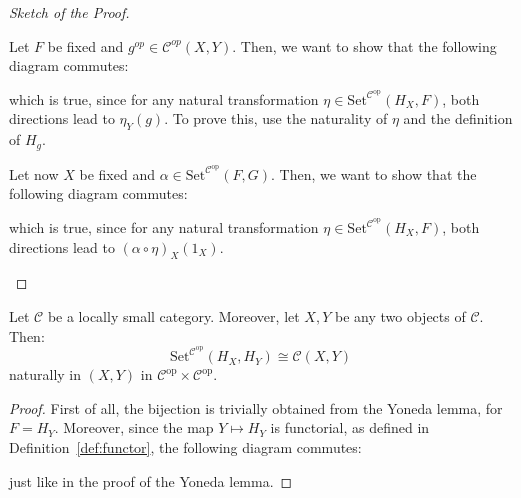 \begin{proof}[Sketch of the Proof]
\begin{itemize}
Let $F$ be fixed and $g^{op}\in\mathcal{C}^{op}(X,Y)$. Then, we want to show that the following diagram commutes:
\begin{center}
\end{center}
which is true, since for any natural transformation $\eta\in\mathrm{Set}^{\mathcal{C}^{\mathrm{op}}}(H_X,F)$, both directions lead to $\eta_Y(g)$. To prove this, use the naturality of $\eta$ and the definition of $H_g$.

Let now $X$ be fixed and $\alpha\in\mathrm{Set}^{\mathcal{C}^{\mathrm{op}}}(F,G)$. Then, we want to show that the following diagram commutes:
\begin{center}
\end{center}
which is true, since for any natural transformation $\eta\in\mathrm{Set}^{\mathcal{C}^{\mathrm{op}}}(H_X,F)$, both directions lead to $(\alpha\circ\eta)_X(1_X)$.\qedhere
\end{itemize}
\end{proof}
\begin{corollary} Let $\mathcal{C}$ be a locally small category. Moreover, let $X,Y$ be any two objects of $\mathcal{C}$. Then:
\[\mathrm{Set}^{\mathcal{C}^{\mathrm{op}}}(H_X,H_Y)\cong\mathcal{C}(X,Y)\]
naturally in $(X,Y)$ in $\mathcal{C}^{\mathrm{op}}\times \mathcal{C}^{\mathrm{op}}$.
\end{corollary}
\begin{proof} First of all, the bijection is trivially obtained from the Yoneda lemma, for $F=H_Y$. Moreover, since the map $Y\mapsto H_Y$ is functorial, as defined in Definition~\ref{def:functor}, the following diagram commutes:
\begin{center}
\end{center}
just like in the proof of the Yoneda lemma.
\end{proof}
